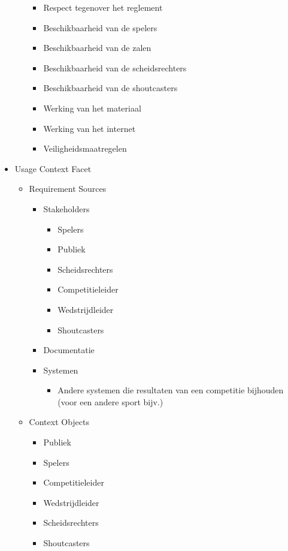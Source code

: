 \documentclass[12pt,a4paper]{article}
\begin{document}
\begin{itemize}
\begin{itemize}
\begin{itemize}
					\item Respect tegenover het reglement
					\item Beschikbaarheid van de spelers
					\item Beschikbaarheid van de zalen
					\item Beschikbaarheid van de scheidsrechters
					\item Beschikbaarheid van de shoutcasters
					\item Werking van het materiaal
					\item Werking van het internet
					\item Veiligheidsmaatregelen
				\end{itemize}
			\end{itemize}
			\item Usage Context Facet
			\begin{itemize}
				\item Requirement Sources
				\begin{itemize}
					\item Stakeholders
					\begin{itemize}
						\item Spelers
						\item Publiek
						\item Scheidsrechters
						\item Competitieleider
						\item Wedstrijdleider
						\item Shoutcasters
					\end{itemize}
					\item Documentatie
					\item Systemen
					\begin{itemize}
						\item Andere systemen die resultaten van een competitie bijhouden (voor een andere sport bijv.)
					\end{itemize}
				\end{itemize}
				\item Context Objects
				\begin{itemize}
					\item Publiek
					\item Spelers
					\item Competitieleider
					\item Wedstrijdleider
					\item Scheidsrechters
					\item Shoutcasters
				\end{itemize}

\end{itemize}
\end{itemize}
\end{document}
